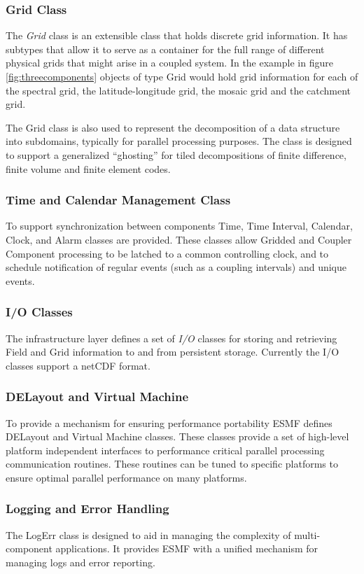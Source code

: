 \subsubsection{Grid Class}
The {\it Grid} class is an extensible class that holds discrete grid information. It has subtypes that allow
it to serve as a container for the full range of different physical grids that might arise in a coupled system.
In the example in figure \ref{fig:threecomponents} objects of type Grid would hold grid information for
each of the spectral grid, the latitude-longitude grid, the mosaic grid and the catchment grid. 

The Grid class is also used to represent the decomposition of a data structure into subdomains, typically for
parallel processing purposes. The class is designed to support a 
generalized ``ghosting'' for tiled 
decompositions of finite difference, finite volume and finite element codes. 

\subsubsection{Time and Calendar Management Class}
To support synchronization between components Time, Time Interval,  Calendar,
Clock, and Alarm classes are provided. These classes allow Gridded and 
Coupler Component processing
to be latched to a common controlling clock, and to schedule notification of
regular events (such as a coupling intervals) and unique events.

\subsubsection{I/O Classes}
The infrastructure layer defines a set of {\it I/O} classes for storing and retrieving Field and Grid information
to and from persistent storage. Currently the I/O classes support a 
netCDF format.

\subsubsection{DELayout and Virtual Machine}
To provide a mechanism for ensuring performance portability ESMF defines DELayout and Virtual Machine classes. These classes provide a set of
high-level platform independent interfaces to performance critical parallel processing communication routines. These routines can be tuned
to specific platforms to ensure optimal parallel performance on many platforms. 
\subsubsection{Logging and Error Handling}
The LogErr class is designed to aid in managing the complexity of 
multi-component applications. It provides ESMF with a unified mechanism 
for managing logs and error reporting.





